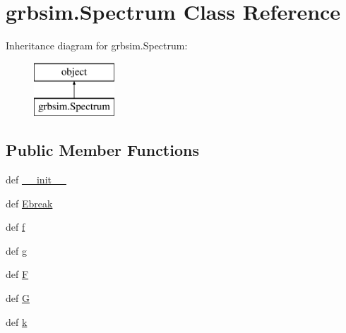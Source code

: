 \hypertarget{classgrbsim_1_1_spectrum}{\section{grbsim.\-Spectrum Class Reference}
\label{classgrbsim_1_1_spectrum}
}
Inheritance diagram for grbsim.\-Spectrum\-:\begin{figure}[H]
\begin{center}
\leavevmode
\includegraphics[height=2.000000cm]{dc/d00/classgrbsim_1_1_spectrum}
\end{center}
\end{figure}
\subsection*{Public Member Functions}
\begin{DoxyCompactItemize}
\item 
def \hyperlink{classgrbsim_1_1_spectrum_a0341c6f78c130b7b38216a8bbc187890}{\-\_\-\-\_\-init\-\_\-\-\_\-}
\item 
def \hyperlink{classgrbsim_1_1_spectrum_a23957ee0259fe9a732bcb4ab2c1cfd71}{Ebreak}
\item 
def \hyperlink{classgrbsim_1_1_spectrum_a3e93391e221ca283750d08b8485c9358}{f}
\item 
def \hyperlink{classgrbsim_1_1_spectrum_acf8ca89dded867c619a5dff3189d34c3}{g}
\item 
def \hyperlink{classgrbsim_1_1_spectrum_aa94d37ec5851e690032cc4fe751f8088}{F}
\item 
def \hyperlink{classgrbsim_1_1_spectrum_a3c80da83d9dd35dd221b34ba511350dc}{G}
\item 
def \hyperlink{classgrbsim_1_1_spectrum_ad6edd414e3397c1513b16052e0853afd}{k}
\end{DoxyCompactItemize}
